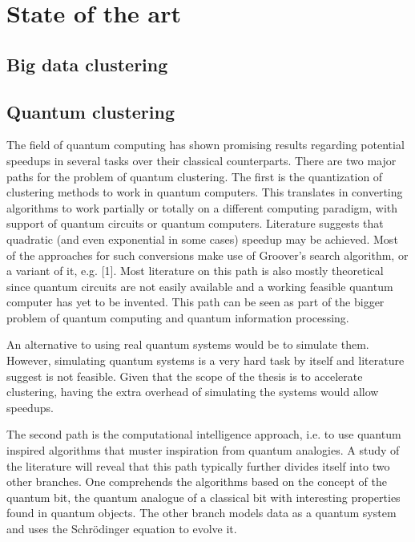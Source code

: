 \section{State of the art}


\subsection{Big data clustering}

\subsection{Quantum clustering}
The field of quantum computing has shown promising results regarding potential speedups in several tasks over their classical counterparts. 
There are two major paths for the problem of quantum clustering. The first is the quantization of clustering methods to work in quantum computers. This translates in converting algorithms to work partially or totally on a different computing paradigm, with support of quantum circuits or quantum computers. Literature suggests that quadratic (and even exponential in some cases) speedup may be achieved. Most of the approaches for such conversions make use of Groover's search algorithm, or a variant of it, e.g. [1]. Most literature on this path is also mostly theoretical since quantum circuits are not easily available and a working feasible quantum computer has yet to be invented. This path can be seen as part of the bigger problem of quantum computing and quantum information processing.


An alternative to using real quantum systems would be to simulate them. However, simulating quantum systems is a very hard task by itself and literature suggest is not feasible. Given that the scope of the thesis is to accelerate clustering, having the extra overhead of simulating the systems would allow speedups.

The second path is the computational intelligence approach, i.e.  to use quantum inspired algorithms that muster inspiration from quantum analogies. A study of the literature will reveal that this path typically further divides itself into two other branches. One comprehends the algorithms based on the concept of the quantum bit, the quantum analogue of a classical bit with interesting properties found in quantum objects. The other branch models data as a quantum system and uses the Schrödinger equation to evolve it.

